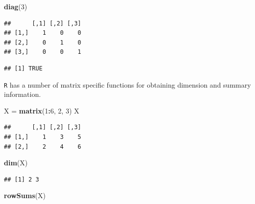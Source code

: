 \documentclass[]{book}
\newenvironment{Shaded}{\begin{snugshade}}{\end{snugshade}}
\newcommand{\KeywordTok}[1]{\textcolor[rgb]{0.13,0.29,0.53}{\textbf{#1}}}
\newcommand{\DecValTok}[1]{\textcolor[rgb]{0.00,0.00,0.81}{#1}}
\newcommand{\StringTok}[1]{\textcolor[rgb]{0.31,0.60,0.02}{#1}}
\newcommand{\OperatorTok}[1]{\textcolor[rgb]{0.81,0.36,0.00}{\textbf{#1}}}
\newcommand{\NormalTok}[1]{#1}
\theoremstyle{definition}
\theoremstyle{definition}
\theoremstyle{definition}
\theoremstyle{remark}
\begin{document}
\begin{Shaded}
\begin{Highlighting}[]
\KeywordTok{diag}\NormalTok{(}\DecValTok{3}\NormalTok{)}
\end{Highlighting}
\end{Shaded}

\begin{verbatim}
##      [,1] [,2] [,3]
## [1,]    1    0    0
## [2,]    0    1    0
## [3,]    0    0    1
\end{verbatim}

\begin{Shaded}
\end{Shaded}

\begin{verbatim}
## [1] TRUE
\end{verbatim}

\texttt{R} has a number of matrix specific functions for obtaining
dimension and summary information.

\begin{Shaded}
\begin{Highlighting}[]
\NormalTok{X =}\StringTok{ }\KeywordTok{matrix}\NormalTok{(}\DecValTok{1}\OperatorTok{:}\DecValTok{6}\NormalTok{, }\DecValTok{2}\NormalTok{, }\DecValTok{3}\NormalTok{)}
\NormalTok{X}
\end{Highlighting}
\end{Shaded}

\begin{verbatim}
##      [,1] [,2] [,3]
## [1,]    1    3    5
## [2,]    2    4    6
\end{verbatim}

\begin{Shaded}
\begin{Highlighting}[]
\KeywordTok{dim}\NormalTok{(X)}
\end{Highlighting}
\end{Shaded}

\begin{verbatim}
## [1] 2 3
\end{verbatim}

\begin{Shaded}
\begin{Highlighting}[]
\KeywordTok{rowSums}\NormalTok{(X)}
\end{Highlighting}
\end{Shaded}
\end{document}
